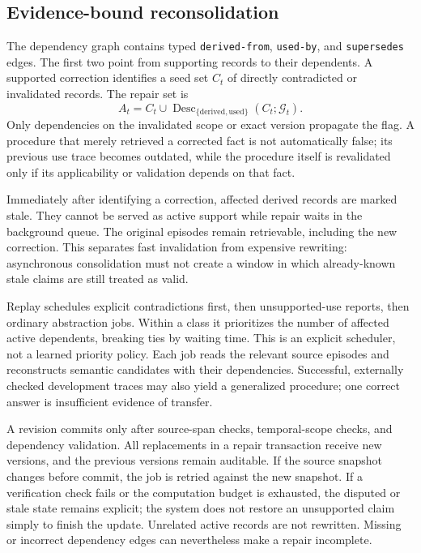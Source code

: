 \documentclass{article}
\newcommand{\Graph}{\mathcal{G}}
\begin{document}
\subsection{Evidence-bound reconsolidation}
\label{sec:reconsolidation}
The dependency graph contains typed \texttt{derived-from}, \texttt{used-by},
and \texttt{supersedes} edges. The first two point from supporting records to
their dependents. A supported correction identifies a seed set $C_t$ of
directly contradicted or invalidated records. The repair set is
\begin{equation}
 A_t=C_t\cup\operatorname{Desc}_{\{\mathrm{derived},\mathrm{used}\}}
       (C_t;\Graph_t).
 \label{eq:closure}
\end{equation}
Only dependencies on the invalidated scope or exact version propagate the
flag. A procedure that merely retrieved a corrected fact is not automatically
false; its previous use trace becomes outdated, while the procedure itself is
revalidated only if its applicability or validation depends on that fact.

Immediately after identifying a correction, affected derived records are
marked stale. They cannot be served as active support while repair waits in
the background queue. The original episodes remain retrievable, including
the new correction. This separates fast invalidation from expensive rewriting:
asynchronous consolidation must not create a window in which already-known
stale claims are still treated as valid.

Replay schedules explicit contradictions first, then unsupported-use reports,
then ordinary abstraction jobs. Within a class it prioritizes the number of
affected active dependents, breaking ties by waiting time. This is an explicit
scheduler, not a learned priority policy. Each job reads the relevant source
episodes and reconstructs semantic candidates with their dependencies.
Successful, externally checked development traces may also yield a generalized
procedure; one correct answer is insufficient evidence of transfer.

A revision commits only after source-span checks, temporal-scope checks, and
dependency validation. All replacements in a repair transaction receive new
versions, and the previous versions remain auditable. If the source snapshot
changes before commit, the job is retried against the new snapshot. If a
verification check fails or the computation budget is exhausted, the disputed
or stale state remains explicit; the system does not restore an unsupported
claim simply to finish the update. Unrelated active records are not rewritten.
Missing or incorrect dependency edges can nevertheless make a repair incomplete.
\end{document}
